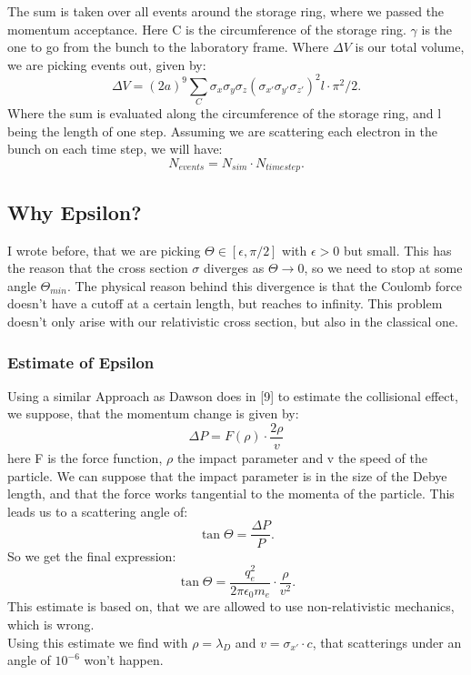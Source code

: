 The sum is taken over all events around the storage ring, where we passed the momentum acceptance. Here C is the circumference of the storage ring. $\gamma$ is the one to go from the bunch to the laboratory frame. Where $\Delta V$ is our total volume, we are picking events out,  given by:
\begin{equation} \Delta V = (2 a)^9 \sum\limits_C \sigma_x \sigma_y \sigma_z (\sigma_{x'} \sigma_{y'} \sigma_{z'})^2 l \cdot \pi^2 / 2. \end{equation}
Where the sum is evaluated along the circumference of the storage ring, and l being the length of one step. Assuming we are scattering each electron in the bunch on each time step, we will have:
\begin{equation} N_{events} = N_{sim} \cdot N_{timestep}. \end{equation}
\subsection{Why Epsilon?}
I wrote before, that we are  picking $\Theta \in \left[\epsilon,\pi/2\right]$ with $\epsilon > 0$ but small. This has the reason that the cross section $\sigma$ diverges as $\Theta \rightarrow 0$, so we need to stop at some angle $\Theta_{min}$. The physical reason behind this divergence is that the Coulomb force doesn't have a cutoff at a certain length, but reaches to infinity. This problem doesn't only arise with our relativistic cross section, but also in the classical one.
\subsubsection{Estimate of Epsilon}
Using a similar Approach as Dawson does in [9] to estimate the collisional effect, we suppose, that the momentum change is given by:
\begin{equation} \Delta P = F(\rho) \cdot \frac{2 \rho} v \end{equation}
here F is the force function, $\rho$ the impact parameter and v the speed of the particle. We can suppose that the impact parameter is in the size of the Debye length, and that the force works tangential to the momenta of the particle. This leads us to a scattering angle of:
\begin{equation} \tan \Theta = \frac{\Delta P}{P}. \end{equation}
So we get the final expression:
\begin{equation} \tan \Theta = \frac{q_e ^2}{2 \pi \epsilon_0 m_e} \cdot \frac{\rho}{v^2}. \end{equation}
This estimate is based on, that we are allowed to use non-relativistic mechanics, which is wrong.\\
Using this estimate we find with $\rho = \lambda_D$ and $v = \sigma_{x'} \cdot c$, that scatterings under an angle of $10^{-6}$ won't happen.
